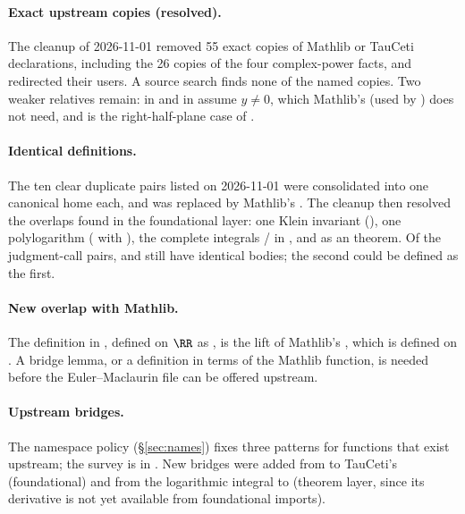 \documentclass[11pt,a4paper]{article}
\newcommand{\dlmf}{\repofile{lean-DLMF}}
\begin{document}
\paragraph{Exact upstream copies (resolved).}
The cleanup of 2026-11-01 removed 55 exact copies of Mathlib or TauCeti declarations,
including the 26 copies of the four complex-power facts, and redirected their users. A source
search finds none of the named copies. Two weaker relatives remain:  in
 and in
 assume $y\ne0$, which Mathlib's
 (used by ) does not need, and
 is the right-half-plane case of
.

\paragraph{Identical definitions.}
The ten clear duplicate pairs listed on 2026-11-01 were consolidated into one canonical home
each, and  was replaced by Mathlib's . The cleanup then resolved
the overlaps found in the foundational layer: one Klein invariant
(), one polylogarithm ( with
), the complete integrals / in
, and  as an
 theorem. Of the judgment-call pairs,  and
 still have identical bodies; the second could be defined as the
first.

\paragraph{New overlap with Mathlib.}
The definition  in
, defined on $\RR$ as
, is the lift of Mathlib's ,
which is defined on . A bridge lemma, or a definition in terms of
the Mathlib function, is needed before the Euler--Maclaurin file can be offered upstream.

\paragraph{Upstream bridges.}
The namespace policy (\S\ref{sec:names}) fixes three patterns for functions that exist
upstream; the survey is in \dlmf{reports/UpstreamNamespaces.tex}. New bridges were added from
 to TauCeti's  (foundational) and from the
logarithmic integral to  (theorem layer, since its derivative
is not yet available from foundational imports).
\end{document}
